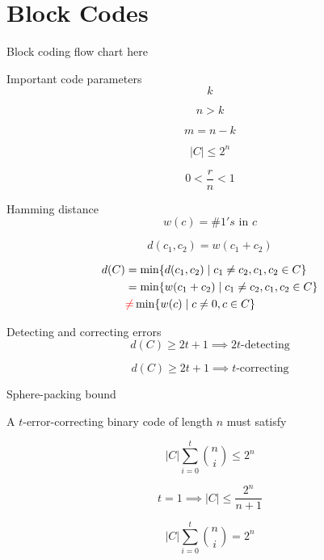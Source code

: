 \section{Block Codes}

\begin{frame}{Block coding}
  flow chart here
\end{frame}
\begin{frame}{Important code parameters}
  \[
	k
  \]

  \[
	n > k
  \]

  \[
	m = n - k
  \]

  \[
	|C| \le 2^n
  \]

  \[
	0 < \frac{r}{n} < 1
  \]
\end{frame}
\begin{frame}{Hamming distance}
  \[
	w(c) = \# 1's \text{ in } c
  \]

  \[
	d(c_1, c_2) = w(c_1 + c_2)
  \]

  \[
	\begin{aligned}
	  d(C) &= \min \{d(c_1, c_2) \mid c_1 \neq c_2, c_1, c_2 \in C\} \\
	  &= \min \{w(c_1 + c_2) \mid c_1 \neq c_2, c_1, c_2 \in C\} \\
	  &\textcolor{red}{\neq} \min \{w(c) \mid c \neq 0, c \in C\}
	\end{aligned}
  \]
\end{frame}
\begin{frame}{Detecting and correcting errors}
  \[
	d(C) \ge 2t + 1 \implies 2t\text{-detecting}
  \]

  \[
	d(C) \ge 2t + 1 \implies t\text{-correcting}
  \]
\end{frame}
\begin{frame}{Sphere-packing bound}
  \begin{theorem}
	A $t$-error-correcting binary code of length $n$ must satisfy

	\[
	  |C| \sum_{i=0}^{t} \binom{n}{i} \le 2^n
	\]
  \end{theorem}

  \[
	t = 1 \implies |C| \le \frac{2^n}{n + 1}
  \]

  \begin{definition}
	\[
	  |C| \sum_{i=0}^{t} \binom{n}{i} = 2^n
	\]
  \end{definition}
\end{frame}
